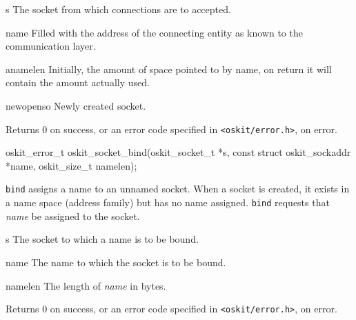 \begin{apiparm}
	\item[s]
		The socket from which connections are to accepted.

	\item[name]
		Filled with the address of the connecting entity as known
		to the communication layer.

	\item[anamelen]
		Initially, the amount of space pointed to by name,
		on return it will contain the amount actually used.

	\item[newopenso]
		Newly created socket.

\end{apiparm}

\begin{apiret}
	Returns 0 on success, or an error code specified in
	{\tt <oskit/error.h>}, on error.
\end{apiret}

%
%

\begin{apisyn}

        \funcproto oskit_error_t
        oskit_socket_bind(oskit_socket_t *s,
		const struct oskit_sockaddr *name,
		oskit_size_t namelen);
\end{apisyn}

\begin{apidesc}
	\texttt{bind} assigns a name to an unnamed socket.
	When a socket is created, it exists in a name space (address family) 
	but has no name assigned. \texttt{bind} requests that 
	\emph{name} be assigned to the socket.

\end{apidesc}

\begin{apiparm}
        \item[s]
                The socket to which a name is to be bound.

        \item[name]
                The name to which the socket is to be bound.

        \item[namelen]
                The length of \emph{name} in bytes.

\end{apiparm}

\begin{apiret}
        Returns 0 on success, or an error code specified in
        {\tt <oskit/error.h>}, on error.
\end{apiret}

